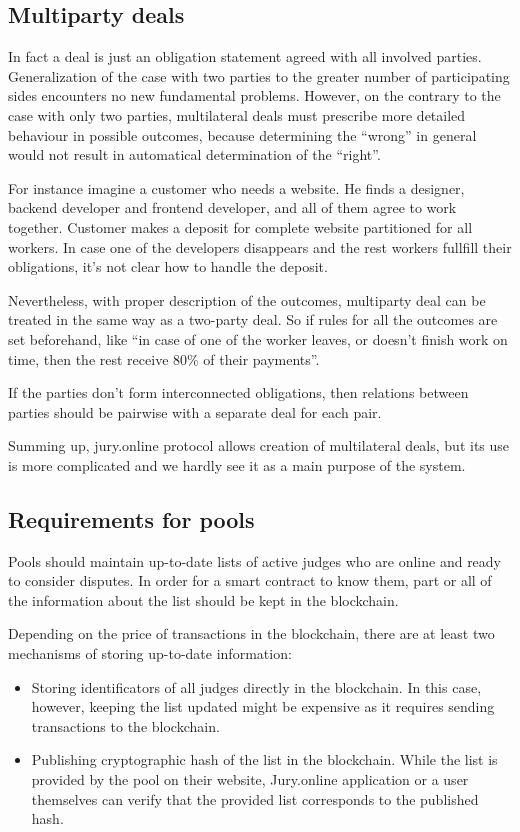 \documentclass[12pt]{article}
\begin{document}
\subsection{Multiparty deals}
In fact a deal is just an obligation statement agreed with all involved parties. Generalization of the case with two
parties to the greater number of participating sides encounters no new fundamental problems.  However, on the contrary
to the case with only two parties, multilateral deals must prescribe more detailed behaviour in possible outcomes,
because determining the ``wrong'' in general would not result in automatical determination of the ``right''.

For instance imagine a customer who needs a website. He finds a designer, backend developer and frontend
developer, and all of them agree to work together. Customer makes a deposit for complete website partitioned for all
workers. In case one of the developers disappears and the rest workers fullfill their obligations, it's not clear how
to handle the deposit. 

Nevertheless, with proper description of the outcomes, multiparty deal can be treated in the same way as a two-party deal. So if rules for all
the outcomes are set beforehand, like ``in case of one of the worker leaves, or doesn't finish work on time, then the
rest receive $80\%$ of their payments''.

If the parties don't form interconnected obligations, then relations between parties should be pairwise with a
separate deal for each pair.

Summing up, jury.online protocol allows creation of multilateral deals, but its use is more complicated and we hardly see
it as a main purpose of the system.

\subsection{Requirements for pools}
Pools should maintain up-to-date lists of active judges who are online and ready to consider disputes. In order for a smart contract to know
them, part or all of the information about the list should be kept in the blockchain. 

Depending on the price of transactions in the blockchain, there are at least two mechanisms of storing up-to-date information:

\begin{itemize}
		\item Storing identificators of all judges directly in the blockchain. In this case, however, keeping the list updated might be expensive as
				it requires sending transactions to the blockchain. 
		\item Publishing cryptographic hash of the list in the blockchain. While the list is
				provided by the pool on their website, Jury.online application or a user themselves can verify that the provided list corresponds to the
				published hash.
\end{itemize}
\end{document}
